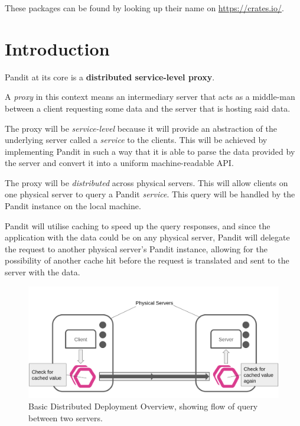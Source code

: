 \documentclass[a4paper,12pt]{report}
\begin{document}
These packages can be found by looking up their name on \href{https://crates.io/}{https://crates.io/}.

\tableofcontents

\listoffigures


\chapter{Introduction}
Pandit at its core is a \textbf{distributed service-level proxy}.

A \textit{proxy} in this context means an intermediary server that acts as a middle-man between a client requesting some data and the server that is hosting said data.

The proxy will be \textit{service-level} because it will provide an abstraction of the underlying server called a \textit{service} to the clients. This
will be achieved by implementing Pandit in such a way that it is able to parse the data provided by the server and convert it into a uniform machine-readable API.

The proxy will be \textit{distributed} across physical servers. This will allow clients on one physical server to query a Pandit \textit{service}. 
This query will be handled by the Pandit instance on the local machine. 

Pandit will utilise caching \cite{caching} to speed up the query responses, and since the application with the data could be on any physical server, Pandit will delegate the request to another physical server's Pandit instance, allowing for the possibility of another cache hit before the request is translated and sent to the server with the data.

\begin{figure}[hbt!]
    \centering
    \includegraphics[width=\linewidth]{fig1.png}
    \caption{Basic Distributed Deployment Overview, showing flow of query between two servers.}
    \label{fig:1}
\end{figure}
\end{document}
